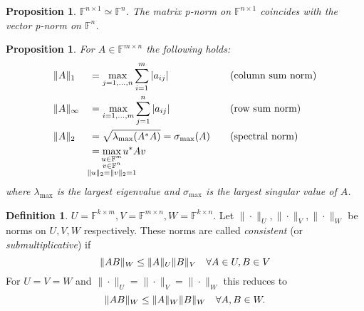 \documentclass[12pt]{article}
\newtheorem{proposition}[theorem]{Proposition}
\theoremstyle{definition}
\newtheorem{definition}[theorem]{Definition}
\theoremstyle{remark}
\numberwithin{equation}{section}
\newcommand{\F}{\mathbb{F}}
\newcommand{\normempty}{\|\cdot\|}
\DeclarePairedDelimiter{\norm}{\lVert}{\rVert}
\begin{document}
\begin{proposition}
  $\F^{n\times 1} \simeq \F^n$. The matrix p-norm on $\F^{n\times 1}$ coincides with the vector p-norm on $\F^n$.
\end{proposition}

\begin{proposition}
  For $A \in \F^{m\times n}$ the following holds:
  \begin{alignat*}{3}
    &\norm{A}_1 &&= \max_{j={1,\ldots,n}} \sum_{i=1}^m |a_{ij}| \quad &&\text{(column sum norm)} \\
    &\norm{A}_\infty &&= \max_{i={1,\ldots,m}} \sum_{j=1}^n |a_{ij}| \quad &&\text{(row sum norm)} \\
    &\norm{A}_2 &&= \sqrt{\lambda_{\max}(A^*A)} = \sigma_{\max}(A) \quad &&\text{(spectral norm)}\\
    &&&= \max_{\mathclap{\substack{u \in \F^m \\ v \in \F^n \\ \norm{u}_2 = \norm{v}_2 = 1}}} u^*Av
  \end{alignat*}
  where $\lambda_{\max}$ is the largest eigenvalue and $\sigma_{\max}$ is the largest singular value of $A$.
\end{proposition}

\begin{definition}
  $U = \F^{k \times m},V = \F^{m \times n},W = \F^{k \times n}$. Let $\normempty_U,\normempty_V,\normempty_W$ be norms on $U,V,W$ respectively. These norms are called \emph{consistent} (or \emph{submultiplicative}) if
  \begin{equation*}
    \norm{AB}_W \leq \norm{A}_U \norm{B}_V \quad \forall A \in U,B \in V
  \end{equation*}
  For $U = V = W$ and $\normempty_U = \normempty_V = \normempty_W$ this reduces to
  \begin{equation*}
    \norm{AB}_W \leq \norm{A}_W \norm{B}_W \quad \forall A,B \in W.
  \end{equation*}
\end{definition}
\end{document}
